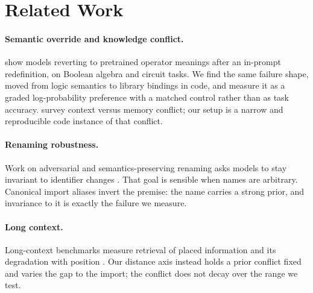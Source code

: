 \documentclass[11pt]{article}
\begin{document}
\section{Related Work}

\paragraph{Semantic override and knowledge conflict.} \citet{thota2026semantic} show models reverting to pretrained operator meanings after an in-prompt redefinition, on Boolean algebra and circuit tasks. We find the same failure shape, moved from logic semantics to library bindings in code, and measure it as a graded log-probability preference with a matched control rather than as task accuracy. \citet{xu2024knowledge} survey context versus memory conflict; our setup is a narrow and reproducible code instance of that conflict.

\paragraph{Renaming robustness.} Work on adversarial and semantics-preserving renaming asks models to stay invariant to identifier changes \citep{ramakrishnan2022semantic}. That goal is sensible when names are arbitrary. Canonical import aliases invert the premise: the name carries a strong prior, and invariance to it is exactly the failure we measure.

\paragraph{Long context.} Long-context benchmarks measure retrieval of placed information and its degradation with position \citep{liu2024lost,modarressi2025nolima}. Our distance axis instead holds a prior conflict fixed and varies the gap to the import; the conflict does not decay over the range we test.
\end{document}
